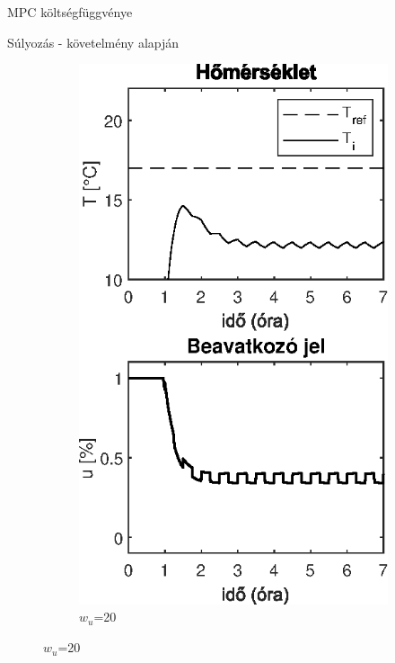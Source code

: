 \documentclass[14pt,handout]{beamer}
\begin{document}
\begin{frame}{MPC költségfüggvénye}

Súlyozás - követelmény alapján

\begin{figure}
	\begin{subfigure}[t]{0.35\textwidth}
		\centering
		\includegraphics[width=\textwidth]{picture/mpc-wu-20.eps}
		\caption{$w_{u}$=20}	
	\end{subfigure}

\end{figure}
\end{frame}
\end{document}
